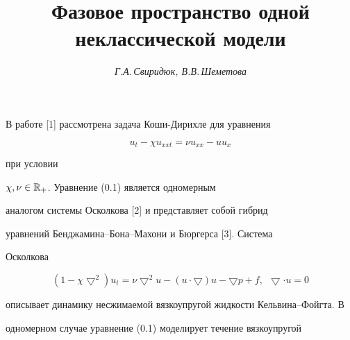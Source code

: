 \author{\it Г.А.\,Свиридюк, В.В.\,Шеметова}




\title{Фазовое пространство одной неклассической модели}





\date{}




\pagestyle{plain} %







\maketitle


\label{begin}





\setcounter{section}{0}








В работе [1] рассмотрена задача Коши-Дирихле для уравнения


\begin{equation}


u_t-\chi u_{xxt}=\nu u_{xx}-u u_x


\end{equation}


при условии


$\chi,\nu \in \Bbb{R}_+$. Уравнение (0.1) является одномерным


аналогом системы Осколкова [2] и представляет собой гибрид


уравнений Бен\-джа\-ми\-на--Бона--Махони и Бюргерса [3]. Система


Осколкова


$$


(1-\chi\bigtriangledown^2)u_t=\nu


\bigtriangledown^2u-(u\cdot\bigtriangledown) u-\bigtriangledown


p+f, \ \  \bigtriangledown \cdot u=0


$$


описывает динамику несжимаемой вязкоупругой жидкости Кельвина--Фойгта. В


одномерном случае уравнение (0.1) моделирует течение вязкоупругой


